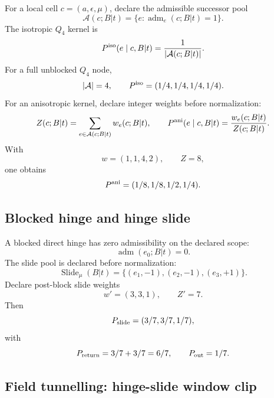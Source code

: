 For a local cell $c=(a,\epsilon,\mu)$, declare the admissible successor pool
\[
\mathcal A(c;B|t)=\{e:\operatorname{adm}_e(c;B|t)=1\}.
\]
The isotropic $Q_4$ kernel is
\[
P^{\rm iso}(e\mid c,B|t)=\frac{1}{|\mathcal A(c;B|t)|}.
\]
For a full unblocked $Q_4$ node,
\[
|\mathcal A|=4,
\qquad
P^{\rm iso}=(1/4,1/4,1/4,1/4).
\]
For an anisotropic kernel, declare integer weights before normalization:
\[
Z(c;B|t)=\sum_{e\in\mathcal A(c;B|t)}w_e(c;B|t),
\qquad
P^{\rm ani}(e\mid c,B|t)=\frac{w_e(c;B|t)}{Z(c;B|t)}.
\]
With
\[
w=(1,1,4,2),
\qquad
Z=8,
\]
one obtains
\[
P^{\rm ani}=(1/8,1/8,1/2,1/4).
\]

\subsection{Blocked hinge and hinge slide}

A blocked direct hinge has zero admissibility on the declared scope:
\[
\operatorname{adm}(e_0;B|t)=0.
\]
The slide pool is declared before normalization:
\[
\operatorname{Slide}_{\mu}(B|t)=\{(e_1,-1),(e_2,-1),(e_3,+1)\}.
\]
Declare post-block slide weights
\[
w'=(3,3,1),
\qquad
Z'=7.
\]
Then
\[
P_{\rm slide}=(3/7,3/7,1/7),
\]
with
\[
P_{\rm return}=3/7+3/7=6/7,
\qquad
P_{\rm out}=1/7.
\]

\subsection{Field tunnelling: hinge-slide window clip}
\label{subsec:field-tunnelling-window-clip}

